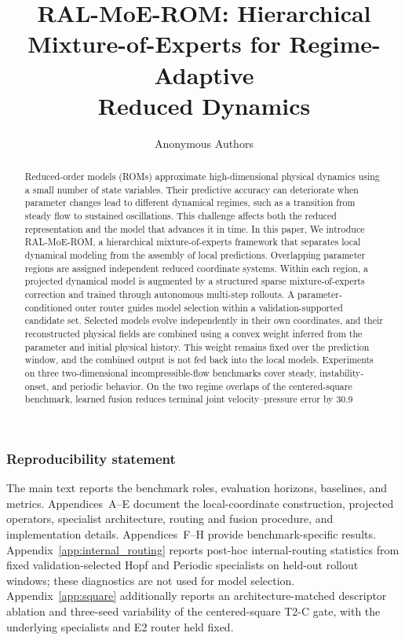 \documentclass{article}
\title{RAL-MoE-ROM: Hierarchical\\
Mixture-of-Experts for Regime-Adaptive\\
Reduced Dynamics}
\author{Anonymous Authors}
\begin{document}
\raggedbottom

\maketitle

\begin{abstract}
Reduced-order models (ROMs) approximate high-dimensional physical dynamics using a small number of state variables. Their predictive accuracy can deteriorate when parameter changes lead to different dynamical regimes, such as a transition from steady flow to sustained oscillations. This challenge affects both the reduced representation and the model that advances it in time. In this paper, We introduce RAL-MoE-ROM, a hierarchical mixture-of-experts framework that separates local dynamical modeling from the assembly of local predictions. Overlapping parameter regions are assigned independent reduced coordinate systems. Within each region, a projected dynamical model is augmented by a structured sparse mixture-of-experts correction and trained through autonomous multi-step rollouts. A parameter-conditioned outer router guides model selection within a validation-supported candidate set. Selected models evolve independently in their own coordinates, and their reconstructed physical fields are combined using a convex weight inferred from the parameter and initial physical history. This weight remains fixed over the prediction window, and the combined output is not fed back into the local models. Experiments on three two-dimensional incompressible-flow benchmarks cover steady, instability-onset, and periodic behavior. On the two regime overlaps of the centered-square benchmark, learned fusion reduces terminal joint velocity–pressure error by 30.9%
\end{abstract}





\FloatBarrier


\subsubsection*{Reproducibility statement}
The main text reports the benchmark roles, evaluation horizons, baselines, and metrics. Appendices~A--E document the local-coordinate construction, projected operators, specialist architecture, routing and fusion procedure, and implementation details. Appendices~F--H provide benchmark-specific results.
Appendix~\ref{app:internal_routing} reports post-hoc internal-routing statistics
from fixed validation-selected Hopf and Periodic specialists on held-out
rollout windows; these diagnostics are not used for model selection.
Appendix~\ref{app:square} additionally reports an architecture-matched descriptor
ablation and three-seed variability of the centered-square T2-C gate, with the
underlying specialists and E2 router held fixed.
\end{document}
